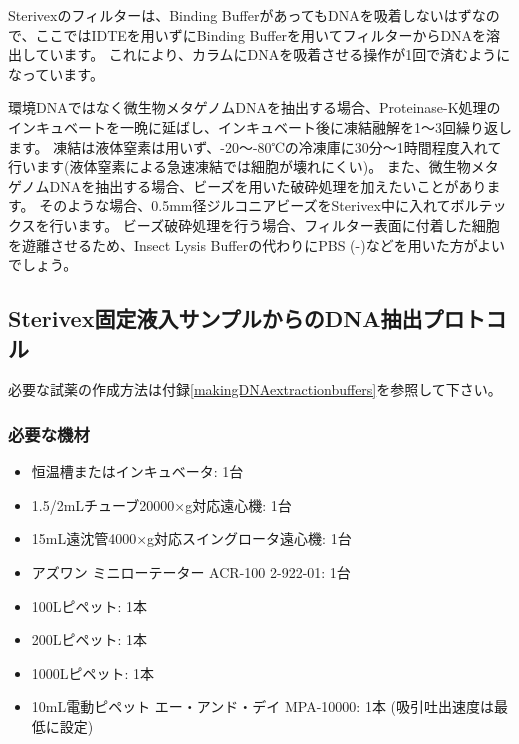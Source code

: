 \documentclass[titlepage,10pt,a4paper,uplatex]{jsbook}
\begin{document}
Sterivexのフィルターは、Binding BufferがあってもDNAを吸着しないはずなので、ここではIDTEを用いずにBinding Bufferを用いてフィルターからDNAを溶出しています。
これにより、カラムにDNAを吸着させる操作が1回で済むようになっています。

環境DNAではなく微生物メタゲノムDNAを抽出する場合、Proteinase-K処理のインキュベートを一晩に延ばし、インキュベート後に凍結融解を1～3回繰り返します。
凍結は液体窒素は用いず、{-20}～{-80}℃の冷凍庫に30分～1時間程度入れて行います(液体窒素による急速凍結では細胞が壊れにくい)。
また、微生物メタゲノムDNAを抽出する場合、ビーズを用いた破砕処理を加えたいことがあります。
そのような場合、0.5mm径ジルコニアビーズをSterivex中に入れてボルテックスを行います\citep{Ushio2019}。
ビーズ破砕処理を行う場合、フィルター表面に付着した細胞を遊離させるため、Insect Lysis Bufferの代わりにPBS (-)などを用いた方がよいでしょう。

\subsection{Sterivex固定液入サンプルからのDNA抽出プロトコル}

必要な試薬の作成方法は付録\ref{makingDNAextractionbuffers}を参照して下さい。

\subsubsection{必要な機材}
\begin{itemize}
\item 恒温槽またはインキュベータ: 1台
\item 1.5/2mLチューブ20000×g対応遠心機: 1台
\item 15mL遠沈管4000×g対応スイングロータ遠心機: 1台
\item アズワン ミニローテーター ACR-100 2-922-01: 1台
\item 100{\textmu}Lピペット: 1本
\item 200{\textmu}Lピペット: 1本
\item 1000{\textmu}Lピペット: 1本
\item 10mL電動ピペット エー・アンド・デイ MPA-10000: 1本 (吸引吐出速度は最低に設定)
\end{itemize}
\end{document}
